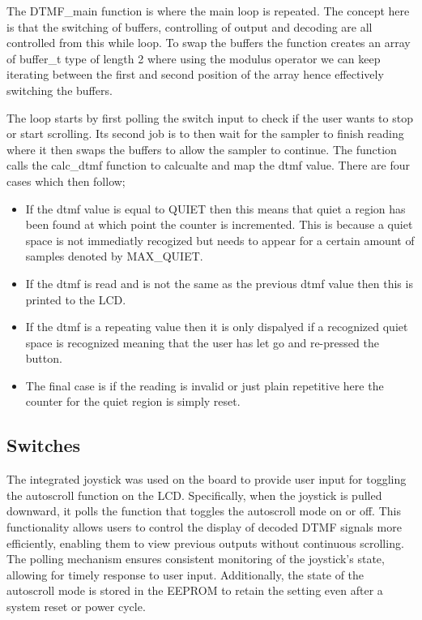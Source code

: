 \documentclass{cce2014-design}
\begin{document}
The DTMF\_main function is where the main loop is repeated. The concept here 
is that the switching of buffers, controlling of output and decoding are all
controlled from this while loop. To swap the buffers the function creates an 
array of buffer\_t type of length 2 where using the modulus operator we can 
keep iterating between the first and second position of the array hence 
effectively switching the buffers.

The loop starts by first polling the switch input to check if the user wants to
stop or start scrolling. Its second job is to then wait for the sampler to finish 
reading where it then swaps the buffers to allow the sampler to continue. The 
function calls the calc\_dtmf function to calcualte and map the dtmf value. 
There are four cases which then follow;
\begin{itemize}
    \item If the dtmf value is equal to QUIET then this means that quiet a 
        region has been found at which point the counter is incremented. This is
        because a quiet space is not immediatly recogized but needs to appear
        for a certain amount of samples denoted by MAX\_QUIET.
    \item If the dtmf is read and is not the same as the previous dtmf value
        then this is printed to the LCD.
    \item If the dtmf is a repeating value then it is only dispalyed if a 
        recognized quiet space is recognized meaning that the user has let go
        and re-pressed the button.
    \item The final case is if the reading is invalid or just plain repetitive
        here the counter for the quiet region is simply reset.
\end{itemize}

\subsection{Switches}
The integrated joystick was used on the board to provide user input for 
toggling the autoscroll function on the LCD. Specifically, when the 
joystick is pulled downward, it polls the function that toggles the autoscroll 
mode on or off. This functionality allows users to control the display of decoded 
DTMF signals more efficiently, enabling them to view previous outputs without 
continuous scrolling. The polling mechanism ensures consistent monitoring of 
the joystick's state, allowing for timely response to user input. Additionally,
the state of the autoscroll mode is stored in the EEPROM to retain the setting 
even after a system reset or power cycle.
\end{document}
